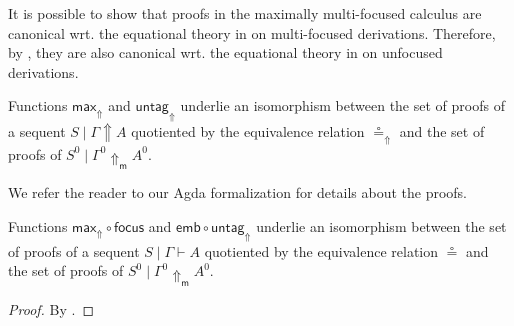 \documentclass[runningheads]{llncs}
\newcommand{\green}[1]{{#1^0}}
\newcommand{\up}{\Uparrow}
\newcommand{\upm}{\Uparrow_{\mathsf{m}}}
\newcommand{\focus}{\mathsf{focus}}
\newcommand{\emb}{\mathsf{emb}}
\begin{document}
It is possible to show that proofs in the maximally multi-focused calculus are canonical wrt. the equational theory in  on multi-focused derivations. Therefore, by , they are also canonical wrt. the equational theory in  on unfocused derivations. 
\begin{theorem}\label{thm3}
  Functions $\mathsf{max}_\up$ and $\mathsf{untag}_\up$ underlie an isomorphism between the set of proofs of a sequent $S \mid \Gamma \up A$ quotiented by the equivalence relation $\circeq_\up$ and the set of proofs of $\green{S} \mid \green{\Gamma} \upm \green{A}$. %
\end{theorem}
We refer the reader to our Agda formalization for details about the proofs.
\begin{corollary}\label{cor}
  Functions $\mathsf{max}_\up\circ \focus$ and $\emb \circ \mathsf{untag}_\up$ underlie an isomorphism between the set of proofs of a sequent $S \mid \Gamma \vdash A$ quotiented by the equivalence relation $\circeq$ and the set of proofs of $\green{S} \mid \green{\Gamma} \upm \green{A}$. %
\end{corollary}
\begin{proof}
  By .
\end{proof}
\end{document}

